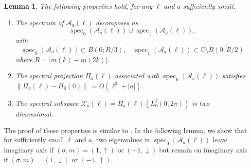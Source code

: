 \documentclass[12pt]{amsart}    %
\newcommand{\M}{\mathcal{M}}
\newcommand{\Z}{\mathbb{Z}}
\newcommand{\C}{\mathbb{C}}
\newcommand{\oneu}{(1,\uparrow)}
\newcommand{\oned}{(1,\downarrow)}
\newcommand{\minu}{(-1,\uparrow)}
\newcommand{\mind}{(-1,\downarrow)}
\newtheorem{lemma}[theorem]{Lemma}
\numberwithin{equation}{section}
\begin{document}

\begin{lemma}\label{l:prop}
The following properties hold, for any $\ell$ and $a$ sufficiently small.\\
\begin{enumerate}
    \item The spectrum of $\mathcal A_a(\ell)$ decomposes as 
    \[
     \operatorname{spec}_0(\mathcal A_a(\ell)) \cup \operatorname{spec}_1(\mathcal A_a(\ell)),
    \]
    with 
    \[
\operatorname{spec}_0(\mathcal A_a(\ell)) \subset B(0;R/3),\quad 
\operatorname{spec}_1(\mathcal A_a(\ell)) \subset \C\setminus \overline{B(0;R/2)} 
\]
where $R=|m(k)-m(2k)|$.
\item The spectral projection $\Pi_a(\ell)$ associated with $\operatorname{spec}_0(\mathcal A_a(\ell)) $ satisfies $\|\Pi_a(\ell)-\Pi_0(0)\|$ = $O(\ell^2+|a|)$.
\item The spectral subspace $\mathcal X_a(\ell) = \Pi_a(\ell)(L^2_0(0,2\pi))$ is two dimensional.
\end{enumerate}
\end{lemma}

The proof of these properties is similar to \cite[Lemma~4.7]{Haragus2011TransverseEquation}. In the following lemma, we show that for sufficiently small $\ell$ and $a$, two eigenvalues in $\operatorname{spec}_0(\mathcal{A}_a(\ell))$ leave imaginary axis if $(\sigma,m)=\oneu$ or $\mind$ but remain on imaginary axis if $(\sigma,m)=\oned$ or $\minu$.
\end{document}
